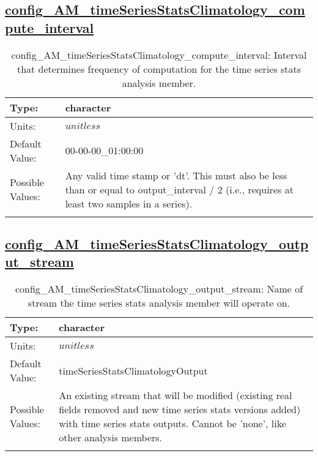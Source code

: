 \subsection[config\_AM\_timeSeriesStatsClimatology\_compute\_interval]{\hyperref[sec:nm_tab_AM_timeSeriesStatsClimatology]{config\_AM\_timeSeriesStatsClimatology\_compute\_interval}}
\label{subsec:nm_sec_config_AM_timeSeriesStatsClimatology_compute_interval}
\begin{center}
\begin{longtable}{| p{2.0in} || p{4.0in} |}
    \hline
    Type: & character \\
    \hline
    Units: & $unitless$ \\
    \hline
    Default Value: & 00-00-00\_01:00:00 \\
    \hline
    Possible Values: & Any valid time stamp or 'dt'. This must also be less than or equal to output\_interval / 2 (i.e., requires at least two samples in a series). \\
    \hline
    \caption{config\_AM\_timeSeriesStatsClimatology\_compute\_interval: Interval that determines frequency of computation for the time series stats analysis member.}
\end{longtable}
\end{center}
\subsection[config\_AM\_timeSeriesStatsClimatology\_output\_stream]{\hyperref[sec:nm_tab_AM_timeSeriesStatsClimatology]{config\_AM\_timeSeriesStatsClimatology\_output\_stream}}
\label{subsec:nm_sec_config_AM_timeSeriesStatsClimatology_output_stream}
\begin{center}
\begin{longtable}{| p{2.0in} || p{4.0in} |}
    \hline
    Type: & character \\
    \hline
    Units: & $unitless$ \\
    \hline
    Default Value: & timeSeriesStatsClimatologyOutput \\
    \hline
    Possible Values: & An existing stream that will be modified (existing real fields removed and new time series stats versions added) with time series stats outputs. Cannot be 'none', like other analysis members. \\
    \hline
    \caption{config\_AM\_timeSeriesStatsClimatology\_output\_stream: Name of stream the time series stats analysis member will operate on.}
\end{longtable}
\end{center}
